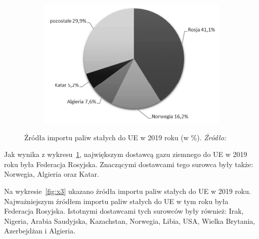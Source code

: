 \documentclass[polish, twoside, 12pt, a4paper]{article}
\theoremstyle{definition}
\theoremstyle{plain}
\theoremstyle{remark}
\begin{document}
\begin{figure}[hbt]
  \centering

  \begin{subfigure}[t]{0.45\textwidth}
    \includegraphics[width=\textwidth]{./figure_2}
  \end{subfigure}

  \captionsetup{margin=10pt,font=small,labelfont=bf,width=.8\textwidth}

  \caption[Źródła importu paliw stałych do UE w 2019 roku (w \%).]{Źródła importu paliw stałych do UE w 2019 roku (w \%). \textit{Źródło:} \cite{pangsykania2022}}\label{fig:x2}
\end{figure}

Jak wynika z wykresu~\ref{fig:x2}, największym dostawcą gazu ziemnego do UE w 2019 roku była Federacja Rosyjska. Znaczącymi dostawcami tego surowca były także: Norwegia, Algieria oraz Katar. 

Na wykresie~\ref{fig:x3} ukazano źródła importu paliw stałych do UE w 2019 roku. Najważniejszym źródłem importu paliw stałych do UE w tym roku była Federacja Rosyjska. Istotnymi dostawcami tych surowców były również: Irak, Nigeria, Arabia Saudyjska, Kazachstan, Norwegia, Libia, USA, Wielka Brytania, Azerbejdżan i Algieria. 
\end{document}
